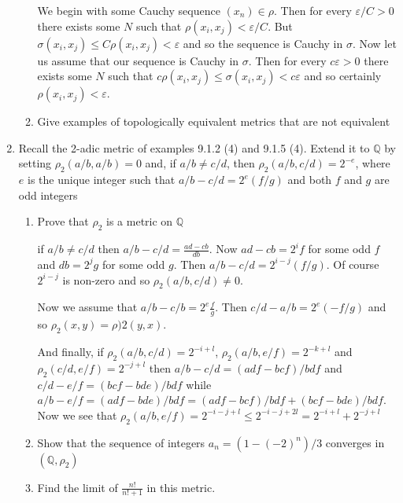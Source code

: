 \documentclass[letterpaper]{article}
\begin{document}
\begin{enumerate}
\begin{enumerate}
    We begin with some Cauchy sequence $(x_n)\in \rho$.
    Then for every $\varepsilon/C>0$ there exists some $N$ such that $\rho(x_i,x_j)<\varepsilon/C$.
    But $\sigma(x_i,x_j)\le C\rho(x_i,x_j)<\varepsilon$ and so the sequence is Cauchy in $\sigma$.
    Now let us assume that our sequence is Cauchy in $\sigma$.
    Then for every $c\varepsilon>0$ there exists some $N$ such that $c\rho(x_i,x_j)\le \sigma(x_i,x_j)<c\varepsilon$ and so certainly $\rho(x_i,x_j)<\varepsilon$.
    \item
    Give examples of topologically equivalent metrics that are not equivalent
  \end{enumerate}
\setcounter{enumi}{10}
\item
Recall the 2-adic metric of examples 9.1.2 (4) and 9.1.5 (4). Extend it to
$\mathbb{Q}$ by setting $\rho_2(a/b,a/b)=0$ and, if $a/b\ne c/d$, then
$\rho_2(a/b,c/d)=2^{-e}$, where $e$ is the unique integer such that
$a/b-c/d=2^e(f/g)$ and both $f$ and $g$ are odd integers
  \begin{enumerate}
    \item
    Prove that $\rho_2$ is a metric on $\mathbb{Q}$

    if $a/b\ne c/d$ then $a/b-c/d=\frac{ad-cb}{db}$. Now $ad-cb=2^{i}f$ for some odd $f$ and $db=2^{j}g$ for some odd $g$. Then $a/b-c/d=2^{i-j}(f/g)$. Of course $2^{i-j}$ is non-zero and so $\rho_2(a/b,c/d)\ne 0$.

    Now we assume that $a/b-c/b=2^e\frac{f}{g}$. Then $c/d-a/b=2^e(-f/g)$ and so $\rho_2(x,y)=\rho)2(y,x)$.

    And finally, if $\rho_2(a/b,c/d)=2^{-i+l}$, $\rho_2(a/b,e/f)=2^{-k+l}$ and $\rho_2(c/d,e/f)=2^{-j+l}$ then $a/b-c/d=(adf-bcf)/bdf$ and $c/d-e/f=(bcf-bde)/bdf$ while $a/b-e/f=(adf-bde)/bdf=(adf-bcf)/bdf+(bcf-bde)/bdf$. Now we see that $\rho_2(a/b,e/f)=2^{-i-j+l}\le 2^{-i-j+2l}=2^{-i+l}+2^{-j+l}$
    \item
    Show that the sequence of integers $a_n=(1-(-2)^n)/3$ converges in
$(\mathbb{Q},\rho_2)$
    \item
    Find the limit of $\displaystyle \frac{n!}{n!+1}$ in this metric.
  \end{enumerate}
\end{enumerate}
\end{document}
